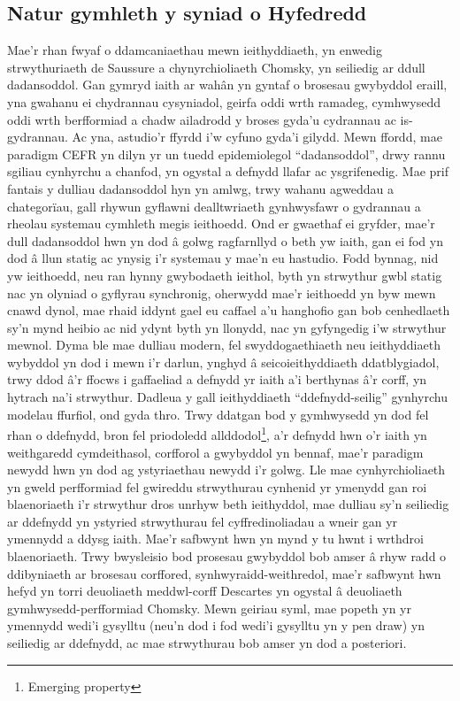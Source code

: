 \subsection{Natur gymhleth y syniad o Hyfedredd}
Mae'r rhan fwyaf o ddamcaniaethau mewn ieithyddiaeth, yn enwedig strwythuriaeth de Saussure a chynyrchioliaeth Chomsky, yn seiliedig ar ddull dadansoddol. Gan gymryd iaith ar wahân yn gyntaf o brosesau gwybyddol eraill, yna gwahanu ei chydrannau cysyniadol, geirfa oddi wrth ramadeg, cymhwysedd oddi wrth berfformiad \parencite{chomsky_aspects_1965} a chadw ailadrodd y broses gyda'u cydrannau ac is-gydrannau. Ac yna, astudio'r ffyrdd i'w cyfuno gyda'i gilydd. Mewn ffordd, mae paradigm CEFR yn dilyn yr un tuedd epidemiolegol ``dadansoddol'', drwy rannu sgiliau cynhyrchu a chanfod, yn ogystal a defnydd llafar ac ysgrifenedig. Mae prif fantais y dulliau dadansoddol hyn yn amlwg, trwy wahanu agweddau a chategorïau, gall rhywun gyflawni dealltwriaeth gynhwysfawr o gydrannau a rheolau systemau cymhleth megis ieithoedd. Ond er gwaethaf ei gryfder, mae'r dull dadansoddol hwn yn dod â golwg ragfarnllyd o beth yw iaith, gan ei fod yn dod â llun statig ac ynysig i'r systemau y mae'n eu hastudio. Fodd bynnag, nid yw ieithoedd, neu ran hynny gwybodaeth ieithol, byth yn strwythur gwbl statig nac yn olyniad o gyflyrau synchronig, oherwydd mae'r ieithoedd yn byw mewn cnawd dynol, mae rhaid iddynt gael eu caffael a'u hanghofio gan bob cenhedlaeth sy'n mynd heibio ac nid ydynt byth yn llonydd, nac yn gyfyngedig i'w strwythur mewnol. Dyma ble mae dulliau modern, fel swyddogaethiaeth neu ieithyddiaeth wybyddol \textcite{evans_cognitive_2009} yn dod i mewn i'r darlun, ynghyd â seicoieithyddiaeth ddatblygiadol, trwy ddod â'r ffocws i gaffaeliad a defnydd yr iaith a'i berthynas â'r corff, yn hytrach na'i strwythur. Dadleua \textcite{bybee_usage-based_1999} y gall ieithyddiaeth ``ddefnydd-seilig'' gynhyrchu modelau ffurfiol, ond gyda thro. Trwy ddatgan bod y gymhwysedd yn dod fel rhan o ddefnydd, bron fel priodoledd allddodol\footnote{Emerging property}, a'r defnydd hwn o'r iaith yn weithgaredd cymdeithasol, corfforol a gwybyddol yn bennaf, mae'r paradigm newydd hwn yn dod ag ystyriaethau newydd i'r golwg. Lle mae cynhyrchioliaeth yn gweld perfformiad fel gwireddu strwythurau cynhenid yr ymenydd gan roi blaenoriaeth i'r strwythur dros unrhyw beth ieithyddol, mae dulliau sy'n seiliedig ar ddefnydd yn ystyried strwythurau fel cyffredinoliadau a wneir gan yr ymennydd a ddysg iaith. Mae'r safbwynt hwn yn mynd y tu hwnt i wrthdroi blaenoriaeth. Trwy bwysleisio bod prosesau gwybyddol bob amser â rhyw radd o ddibyniaeth ar brosesau corffored, synhwyraidd-weithredol, mae'r safbwynt hwn hefyd yn torri deuoliaeth meddwl-corff Descartes \parencite{varela_embodied_1991} yn ogystal â deuoliaeth gymhwysedd-perfformiad Chomsky. Mewn geiriau syml, mae popeth yn yr ymennydd wedi'i gysylltu (neu'n dod i fod wedi'i gysylltu yn y pen draw) yn seiliedig ar ddefnydd, ac mae strwythurau bob amser yn dod a posteriori.


